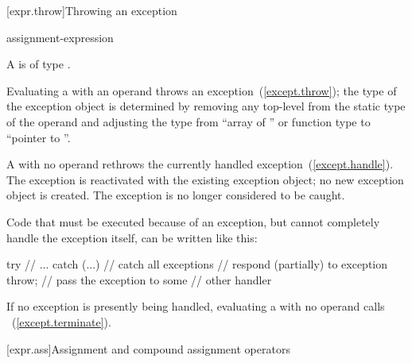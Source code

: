 [expr.throw]{Throwing an exception}%
%
%
%
%
\begin{bnf}
\br
      assignment-expression\opt
\end{bnf}

\pnum
A  is of type .

\pnum
Evaluating a  with an operand throws an
exception~(\ref{except.throw}); the type of the exception object is determined by removing
any top-level  from the static type of the
operand and adjusting the type
from ``array of '' or function type 
to ``pointer to ''.

\pnum
{}%
A
with no operand rethrows the currently handled exception~(\ref{except.handle}).
The exception is reactivated with the existing exception object;
no new exception object is created.
The exception is no longer considered to be caught.
\begin{example}
Code that must be executed because of an exception, but cannot
completely handle the exception itself, can be written like this:
\begin{codeblock}
try {
    // ...
} catch (...) {     // catch all exceptions
  // respond (partially) to exception
  throw;            // pass the exception to some
                    // other handler
}
\end{codeblock}
\end{example}

\pnum
{}%
%
%
If no exception is presently being handled,
evaluating a
with no operand calls
~(\ref{except.terminate}).

[expr.ass]{Assignment and compound assignment operators}%

